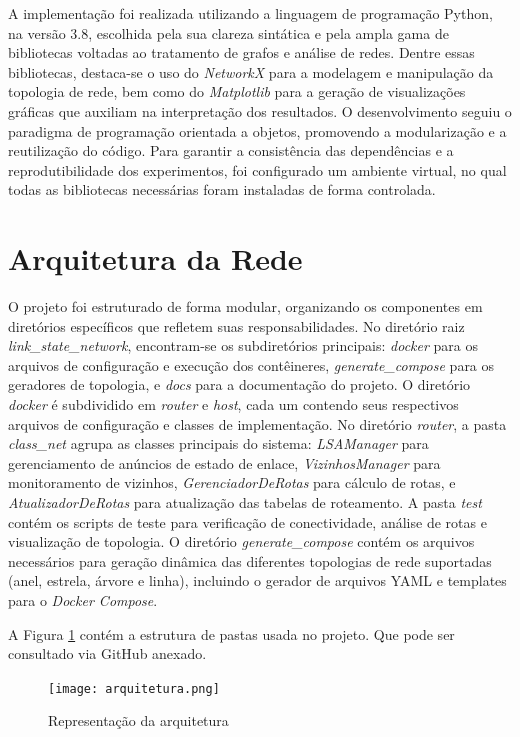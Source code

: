 \documentclass[12pt,a4paper]{report}
\begin{document}
A implementação foi realizada utilizando a linguagem de programação Python, na versão 3.8, escolhida pela sua clareza sintática e pela ampla gama de bibliotecas voltadas ao tratamento de grafos e análise de redes. Dentre essas bibliotecas, destaca-se o uso do \textit{NetworkX} para a modelagem e manipulação da topologia de rede, bem como do \textit{Matplotlib} para a geração de visualizações gráficas que auxiliam na interpretação dos resultados. O desenvolvimento seguiu o paradigma de programação orientada a objetos, promovendo a modularização e a reutilização do código. Para garantir a consistência das dependências e a reprodutibilidade dos experimentos, foi configurado um ambiente virtual, no qual todas as bibliotecas necessárias foram instaladas de forma controlada.

\section{Arquitetura da Rede}

O projeto foi estruturado de forma modular, organizando os componentes em diretórios específicos que refletem suas responsabilidades. No diretório raiz \textit{link\_state\_network}, encontram-se os subdiretórios principais: \textit{docker} para os arquivos de configuração e execução dos contêineres, \textit{generate\_compose} para os geradores de topologia, e \textit{docs} para a documentação do projeto. O diretório \textit{docker} é subdividido em \textit{router} e \textit{host}, cada um contendo seus respectivos arquivos de configuração e classes de implementação. No diretório \textit{router}, a pasta \textit{class\_net} agrupa as classes principais do sistema: \textit{LSAManager} para gerenciamento de anúncios de estado de enlace, \textit{VizinhosManager} para monitoramento de vizinhos, \textit{GerenciadorDeRotas} para cálculo de rotas, e \textit{AtualizadorDeRotas} para atualização das tabelas de roteamento. A pasta \textit{test} contém os scripts de teste para verificação de conectividade, análise de rotas e visualização de topologia. O diretório \textit{generate\_compose} contém os arquivos necessários para geração dinâmica das diferentes topologias de rede suportadas (anel, estrela, árvore e linha), incluindo o gerador de arquivos YAML e templates para o \textit{Docker Compose}.

A Figura \ref{fig:arquitetura} contém a estrutura de pastas usada no projeto. Que pode ser consultado via GitHub anexado.
\begin{figure}[h!]
    \centering
    \texttt{[image: arquitetura.png]}
    \caption{Representação da arquitetura}
    \label{fig:arquitetura}
\end{figure}
\end{document}
